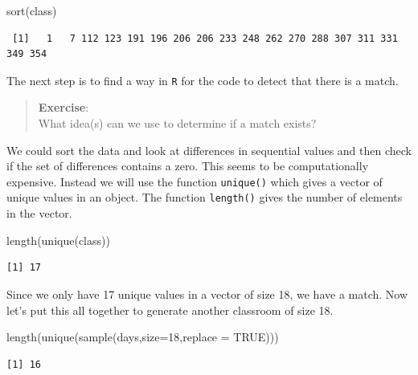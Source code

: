 \documentclass[
  letterpaper,
  DIV=11,
  numbers=noendperiod]{scrreprt}
\newenvironment{Shaded}{\begin{snugshade}}{\end{snugshade}}
\newcommand{\AttributeTok}[1]{\textcolor[rgb]{0.40,0.45,0.13}{#1}}
\newcommand{\ConstantTok}[1]{\textcolor[rgb]{0.56,0.35,0.01}{#1}}
\newcommand{\DecValTok}[1]{\textcolor[rgb]{0.68,0.00,0.00}{#1}}
\newcommand{\FunctionTok}[1]{\textcolor[rgb]{0.28,0.35,0.67}{#1}}
\newcommand{\NormalTok}[1]{\textcolor[rgb]{0.00,0.23,0.31}{#1}}
\begin{document}
\begin{Shaded}
\begin{Highlighting}[]
\FunctionTok{sort}\NormalTok{(class)}
\end{Highlighting}
\end{Shaded}

\begin{verbatim}
 [1]   1   7 112 123 191 196 206 206 233 248 262 270 288 307 311 331 349 354
\end{verbatim}

The next step is to find a way in \texttt{R} for the code to detect that
there is a match.

\begin{quote}
\textbf{Exercise}:\\
What idea(s) can we use to determine if a match exists?
\end{quote}

We could sort the data and look at differences in sequential values and
then check if the set of differences contains a zero. This seems to be
computationally expensive. Instead we will use the function
\texttt{unique()} which gives a vector of unique values in an object.
The function \texttt{length()} gives the number of elements in the
vector.

\begin{Shaded}
\begin{Highlighting}[]
\FunctionTok{length}\NormalTok{(}\FunctionTok{unique}\NormalTok{(class))}
\end{Highlighting}
\end{Shaded}

\begin{verbatim}
[1] 17
\end{verbatim}

Since we only have 17 unique values in a vector of size 18, we have a
match. Now let's put this all together to generate another classroom of
size 18.

\begin{Shaded}
\begin{Highlighting}[]
\FunctionTok{length}\NormalTok{(}\FunctionTok{unique}\NormalTok{(}\FunctionTok{sample}\NormalTok{(days,}\AttributeTok{size=}\DecValTok{18}\NormalTok{,}\AttributeTok{replace =} \ConstantTok{TRUE}\NormalTok{)))}
\end{Highlighting}
\end{Shaded}

\begin{verbatim}
[1] 16
\end{verbatim}
\end{document}
